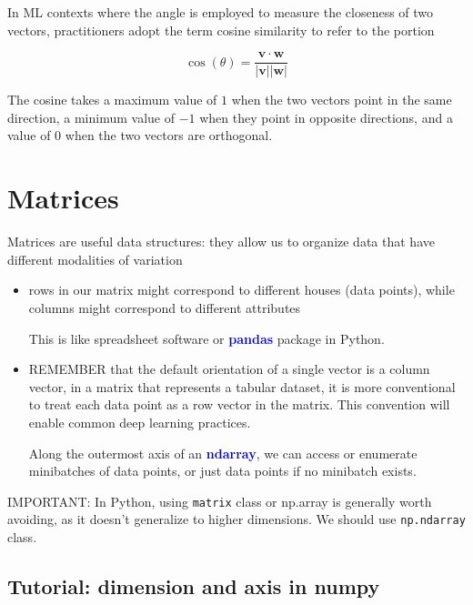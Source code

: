In ML contexts where the angle is employed to measure the closeness of two
vectors, practitioners adopt the term cosine similarity to refer to the portion

\begin{equation}
\cos(\theta) = \frac{\mathbf{v}\cdot\mathbf{w}}{|\mathbf{v}||\mathbf{w}|}
\end{equation}

The cosine takes a maximum value of $1$ when the two vectors point in the same
direction, a minimum value of $-1$ when they point in opposite directions, and a
value of $0$ when the two vectors are orthogonal.


\section{Matrices}
\label{sec:math-matrix}

Matrices are useful data structures: they allow us to organize data that have different modalities of variation
\begin{itemize}
  \item  rows in our matrix might correspond to different houses (data points), while columns might correspond to different attributes
  
  This is like  spreadsheet software or \textcolor{blue}{\bf pandas} package in Python.
  
  \item  
  
  
  REMEMBER  that the default orientation of a single vector is a column vector,
  in a matrix that represents a tabular dataset, it is more conventional to
  treat each data point as a row vector in the matrix. This convention will
  enable common deep learning practices.
  
  Along the outermost axis of an \textcolor{blue}{\bf ndarray}, we can access or
  enumerate minibatches of data points, or just data points if no minibatch
  exists.
  
\end{itemize}


IMPORTANT: In Python, using \verb!matrix! class or np.array is generally worth avoiding, as it doesn't
generalize to higher dimensions. We should use \verb!np.ndarray! class. 

\subsection{Tutorial: dimension and axis in numpy}

